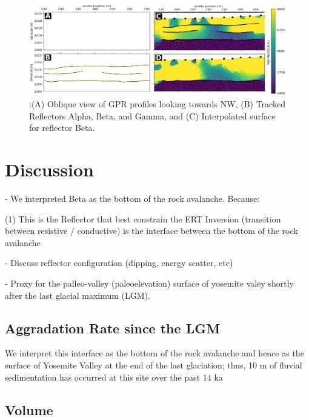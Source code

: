 \documentclass[5p]{elsarticle}
\begin{document}
                                \begin{figure}[h]

	\includegraphics[width=\textwidth]{Figures/Combined_ABCD.pdf}
		\caption{:(A) Oblique view of GPR profiles looking towards NW, (B) Tracked Reflectors Alpha, Beta, and Gamma, and (C) Interpolated surface for reflector Beta. \label{Combined_ABCD}}

								   \end{figure}





\section{Discussion}

- We interpreted Beta as the bottom of the rock avalanche. Because: 

	(1) This is the Reflector that best constrain the ERT Inversion (transition between resistive / 	conductive) is the interface between the bottom of the rock avalanche


- Discuss reflector configuration (dipping, energy scatter, etc) 


- Proxy for the palleo-valley (paleoelevation)  surface of yosemite valey shortly after the last glacial maximum (LGM).



\subsection{Aggradation Rate since the LGM}

We interpret this interface as the bottom of the rock avalanche and hence as the surface of Yosemite Valley at the end of the last glaciation; thus,   10 m of fluvial sedimentation has occurred at this site over the past 14 ka




\subsection{Volume}
\end{document}
